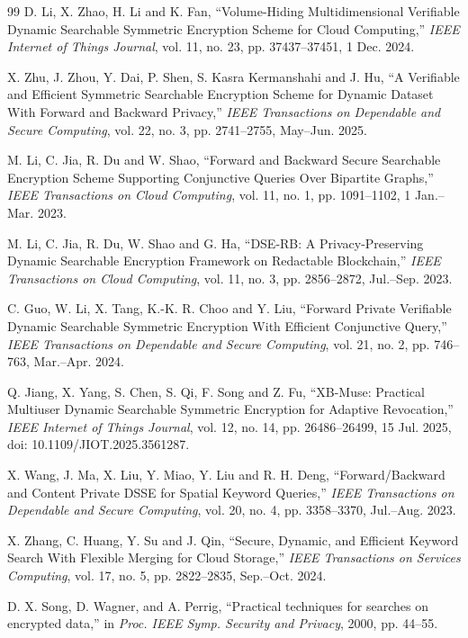 \documentclass{ieeetj}
\theoremstyle{ieee-style}
\begin{document}
\begin{thebibliography}{99}
D. Li, X. Zhao, H. Li and K. Fan, “Volume-Hiding Multidimensional Verifiable Dynamic Searchable Symmetric Encryption Scheme for Cloud Computing,” \emph{IEEE Internet of Things Journal}, vol. 11, no. 23, pp. 37437–37451, 1 Dec. 2024.

X. Zhu, J. Zhou, Y. Dai, P. Shen, S. Kasra Kermanshahi and J. Hu, “A Verifiable and Efficient Symmetric Searchable Encryption Scheme for Dynamic Dataset With Forward and Backward Privacy,” \emph{IEEE Transactions on Dependable and Secure Computing}, vol. 22, no. 3, pp. 2741–2755, May–Jun. 2025.

M. Li, C. Jia, R. Du and W. Shao, “Forward and Backward Secure Searchable Encryption Scheme Supporting Conjunctive Queries Over Bipartite Graphs,” \emph{IEEE Transactions on Cloud Computing}, vol. 11, no. 1, pp. 1091–1102, 1 Jan.–Mar. 2023.

M. Li, C. Jia, R. Du, W. Shao and G. Ha, “DSE-RB: A Privacy-Preserving Dynamic Searchable Encryption Framework on Redactable Blockchain,” \emph{IEEE Transactions on Cloud Computing}, vol. 11, no. 3, pp. 2856–2872, Jul.–Sep. 2023.

C. Guo, W. Li, X. Tang, K.-K. R. Choo and Y. Liu, “Forward Private Verifiable Dynamic Searchable Symmetric Encryption With Efficient Conjunctive Query,” \emph{IEEE Transactions on Dependable and Secure Computing}, vol. 21, no. 2, pp. 746–763, Mar.–Apr. 2024.

Q. Jiang, X. Yang, S. Chen, S. Qi, F. Song and Z. Fu, “XB-Muse: Practical Multiuser Dynamic Searchable Symmetric Encryption for Adaptive Revocation,” \emph{IEEE Internet of Things Journal}, vol. 12, no. 14, pp. 26486–26499, 15 Jul. 2025, doi: 10.1109/JIOT.2025.3561287.

X. Wang, J. Ma, X. Liu, Y. Miao, Y. Liu and R. H. Deng, “Forward/Backward and Content Private DSSE for Spatial Keyword Queries,” \emph{IEEE Transactions on Dependable and Secure Computing}, vol. 20, no. 4, pp. 3358–3370, Jul.–Aug. 2023.

X. Zhang, C. Huang, Y. Su and J. Qin, “Secure, Dynamic, and Efficient Keyword Search With Flexible Merging for Cloud Storage,” \emph{IEEE Transactions on Services Computing}, vol. 17, no. 5, pp. 2822–2835, Sep.–Oct. 2024.

D. X. Song, D. Wagner, and A. Perrig, “Practical techniques for searches on encrypted data,” in \emph{Proc. IEEE Symp. Security and Privacy}, 2000, pp. 44–55.


\end{thebibliography}
\end{document}
